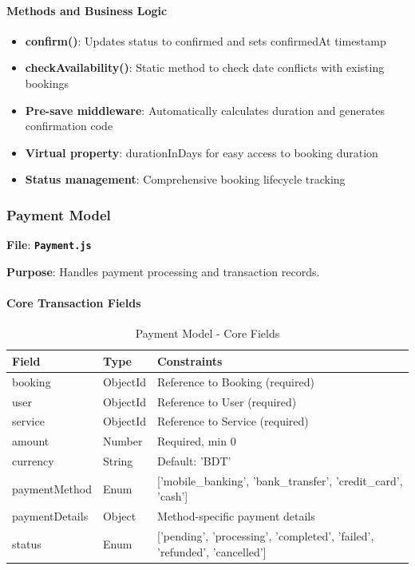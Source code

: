 \documentclass[12pt,a4paper]{article}
\newcommand{\file}[1]{\textbf{\texttt{#1}}}
\begin{document}
\paragraph{Methods and Business Logic}
\begin{itemize}
\item \textbf{confirm()}: Updates status to confirmed and sets confirmedAt timestamp
\item \textbf{checkAvailability()}: Static method to check date conflicts with existing bookings
\item \textbf{Pre-save middleware}: Automatically calculates duration and generates confirmation code
\item \textbf{Virtual property}: durationInDays for easy access to booking duration
\item \textbf{Status management}: Comprehensive booking lifecycle tracking
\end{itemize}

\subsubsection{Payment Model}
\label{subsubsec:payment-model}

\textbf{File}: \file{Payment.js}

\textbf{Purpose}: Handles payment processing and transaction records.

\paragraph{Core Transaction Fields}
\begin{table}[H]
\centering
\small
\begin{tabular}{@{}lll@{}}
\toprule
\textbf{Field} & \textbf{Type} & \textbf{Constraints} \\
\midrule
booking & ObjectId & Reference to Booking (required) \\
user & ObjectId & Reference to User (required) \\
service & ObjectId & Reference to Service (required) \\
amount & Number & Required, min 0 \\
currency & String & Default: 'BDT' \\
paymentMethod & Enum & ['mobile\_banking', 'bank\_transfer', 'credit\_card', 'cash'] \\
paymentDetails & Object & Method-specific payment details \\
status & Enum & ['pending', 'processing', 'completed', 'failed', 'refunded', 'cancelled'] \\
\bottomrule
\end{tabular}
\caption{Payment Model - Core Fields}
\label{tab:payment-core-schema}
\end{table}
\end{document}

